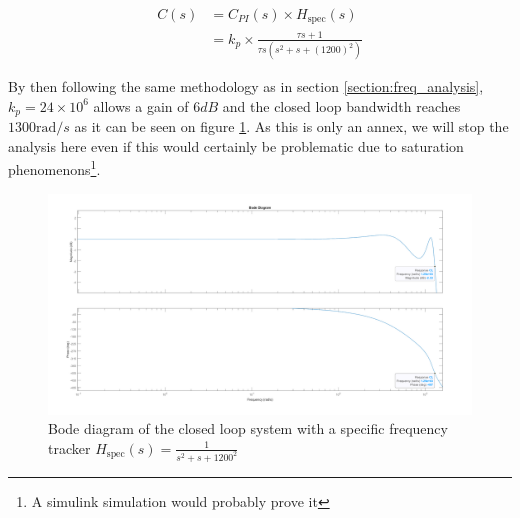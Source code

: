 \begin{align}
    C(s) &= C_{PI}(s) \times H_{\text{spec}}(s)\\
    &= k_p\times\frac{\tau s + 1}{\tau s(s^2+s+(1200)^2)}
\end{align}

By then following the same methodology as in section \ref{section:freq_analysis}, $k_p = 24\times 10^6$ allows a gain 
of $6 dB$ and the closed loop bandwidth reaches $1300 \text{rad}/s$ as it can be seen on figure 
\ref{fig:spec_ref_tracker}. As this is only an annex, we will stop the analysis here even if this would certainly be 
problematic due to saturation phenomenons\footnote{A simulink simulation would probably prove it}. 

\begin{figure}[H]
    \centering
    \includegraphics[height=\textheight/3]{Pictures/annex_spec_cmplx.png}
    \caption{Bode diagram of the closed loop system with a specific frequency tracker $H_{\text{spec}}(s) = \frac{1}{s^2
    +s+1200^2}$}
    \label{fig:spec_ref_tracker}
\end{figure}


